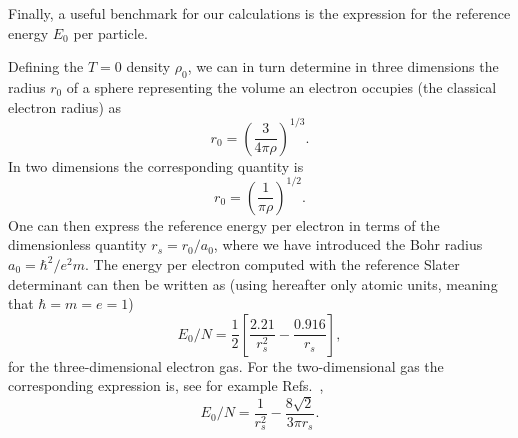 \documentclass[aps,twocolumn,showpacs,floatfix,nofootinbib,preprintnumbers,superscriptaddress,amsmath,amssymb]{revtex4-1}
\begin{document}
Finally, a useful benchmark for our calculations is the expression for the reference energy $E_0$ per particle.

Defining the $T=0$ density $\rho_0$, we can in turn determine  in three dimensions the radius $r_0$ of a sphere representing the volume an electron occupies (the classical electron radius)
as
\[
r_0= \left(\frac{3}{4\pi \rho}\right)^{1/3}.  
\]
In two dimensions the corresponding quantity is
\[
r_0= \left(\frac{1}{\pi \rho}\right)^{1/2}.  
\]
One can then express the reference energy per electron in terms of the dimensionless quantity
$r_s=r_0/a_0$, where 
we have introduced the  Bohr radius $a_0=\hbar^2/e^2m$. The energy per electron computed with the reference Slater determinant  can then be written as \cite{fetter} (using hereafter  only atomic units, meaning that $\hbar = m = e = 1$)
\[
E_0/N=\frac{1}{2}\left[\frac{2.21}{r_s^2}-\frac{0.916}{r_s}\right],
\]
for the three-dimensional electron gas.
For the two-dimensional gas the corresponding expression is, see for example 
Refs.~\cite{rajagopal1977,tanatar1989},
\[
E_0/N=\frac{1}{r_s^2}-\frac{8\sqrt{2}}{3\pi r_s}.
\]
\end{document}
